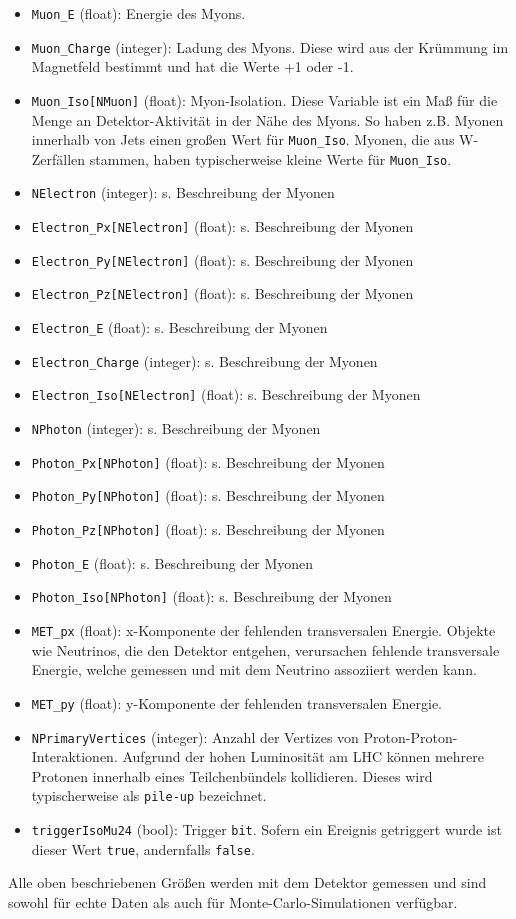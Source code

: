 \begin{itemize}
	\item \texttt{Muon\_E} (float): Energie des Myons.
	\item \texttt{Muon\_Charge} (integer): Ladung des Myons. Diese wird aus der Kr\"ummung im Magnetfeld bestimmt und hat die Werte +1 oder -1.
	\item \texttt{Muon\_Iso[NMuon]} (float): Myon-Isolation. Diese Variable ist ein Ma\ss{} f\"ur die Menge an Detektor-Aktivit\"at in der N\"ahe des Myons. So haben z.B. Myonen innerhalb von Jets einen gro\ss{}en Wert f\"ur \texttt{Muon\_Iso}. Myonen, die aus W-Zerf\"allen stammen, haben typischerweise kleine Werte f\"ur \texttt{Muon\_Iso}.
	\item \texttt{NElectron} (integer): s. Beschreibung der Myonen
	\item \texttt{Electron\_Px[NElectron]} (float): s. Beschreibung der Myonen
	\item \texttt{Electron\_Py[NElectron]} (float): s. Beschreibung der Myonen
	\item \texttt{Electron\_Pz[NElectron]} (float): s. Beschreibung der Myonen
	\item \texttt{Electron\_E} (float): s. Beschreibung der Myonen
	\item \texttt{Electron\_Charge} (integer): s. Beschreibung der Myonen
	\item \texttt{Electron\_Iso[NElectron]} (float): s. Beschreibung der Myonen
	\item \texttt{NPhoton} (integer): s. Beschreibung der Myonen
	\item \texttt{Photon\_Px[NPhoton]} (float): s. Beschreibung der Myonen
	\item \texttt{Photon\_Py[NPhoton]} (float): s. Beschreibung der Myonen
	\item \texttt{Photon\_Pz[NPhoton]} (float): s. Beschreibung der Myonen
	\item \texttt{Photon\_E} (float): s. Beschreibung der Myonen
	\item \texttt{Photon\_Iso[NPhoton]} (float): s. Beschreibung der Myonen
	\item \texttt{MET\_px} (float): x-Komponente der fehlenden transversalen Energie. Objekte wie Neutrinos, die den Detektor entgehen, verursachen fehlende transversale Energie, welche gemessen und mit dem Neutrino assoziiert werden kann.
	\item \texttt{MET\_py} (float): y-Komponente der fehlenden transversalen Energie.
	\item \texttt{NPrimaryVertices} (integer): Anzahl der Vertizes von Proton-Proton-Interaktionen. Aufgrund der hohen Luminosit\"at am LHC k\"onnen mehrere Protonen innerhalb eines Teilchenb\"undels kollidieren. Dieses wird typischerweise als \texttt{pile-up} bezeichnet.
	\item \texttt{triggerIsoMu24} (bool): Trigger \texttt{bit}. Sofern ein Ereignis getriggert wurde ist dieser Wert \texttt{true}, andernfalls \texttt{false}. 
\end{itemize}
Alle oben beschriebenen Gr\"o\ss{}en werden mit dem Detektor gemessen und sind sowohl f\"ur echte Daten als auch f\"ur Monte-Carlo-Simulationen verf\"ugbar. 


